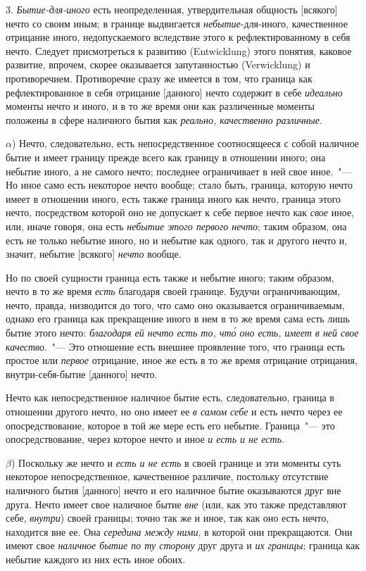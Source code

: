 3. \emph{Бытие-для-иного} есть неопределенная, утвердительная
общность [всякого] нечто со своим иным; в границе
выдвигается \emph{небытие}-для-иного, качественное отрицание
иного, недопускаемого вследствие этого к рефлектированному
в себя нечто. Следует присмотреться к развитию
(Entwicklung) этого понятия, каковое развитие, впрочем,
скорее оказывается запутанностью (Verwicklung) и противоречием.
Противоречие сразу же имеется в том, что граница
как рефлектированное в себя отрицание [данного] нечто
содержит в себе \emph{идеально} моменты нечто и иного, и в то же
время они как различенные моменты положены в сфере
наличного бытия как \emph{реально, качественно различные}.

$\alpha$) Нечто, следовательно, есть непосредственное соотносящееся
с собой наличное бытие и имеет границу прежде
всего как границу в отношении иного; она небытие
иного, а не самого нечто; последнее ограничивает в ней
свое иное.~"--- Но иное само есть некоторое нечто вообще;
стало быть, граница, которую нечто имеет в отношении
иного, есть также граница иного как нечто, граница этого
нечто, посредством которой оно не допускает к себе
первое нечто как \emph{свое} иное, или, иначе говоря, она есть
\emph{небытие этого первого нечто}; таким образом, она есть не
только небытие иного, но и небытие как одного, так и
другого нечто и, значит, небытие [всякого] \emph{нечто} вообще.

Но по своей сущности граница есть также и небытие
иного; таким образом, нечто в то же время \emph{есть} благодаря
своей границе. Будучи ограничивающим, нечто,
правда, низводится до того, что само оно оказывается
ограничиваемым, однако его граница как прекращение
иного в нем в то же время сама есть лишь бытие этого
нечто: \emph{благодаря ей нечто есть то, чт\'о оно есть, имеет в
ней свое качество}.~"--- Это отношение есть внешнее проявление
того, что граница есть простое или \emph{первое} отрицание,
иное же есть в то же время отрицание отрицания,
внутри-себя-бытие [данного] нечто.

Нечто как непосредственное наличное бытие есть, следовательно,
граница в отношении другого нечто, но оно
имеет ее \emph{в самом себе} и есть нечто через ее опосредствование,
которое в той же мере есть его небытие. Граница~"---
это опосредствование, через которое нечто и иное
\emph{и есть и не есть}.

$\beta$) Поскольку же нечто и \emph{есть и не есть} в своей границе
и эти моменты суть некоторое непосредственное, качественное
различие, постольку отсутствие наличного
бытия [данного] нечто и его наличное бытие оказываются
друг вне друга. Нечто имеет свое наличное бытие \emph{вне}
(или, как это также представляют себе, \emph{внутри}) своей
границы; точно так же и иное, так как оно есть нечто,
находится вне ее. Она \emph{середина между ними}, в которой
они прекращаются. Они имеют свое \emph{наличное бытие по
ту сторону} друг друга и \emph{их границы}; граница как небытие
каждого из них есть иное обоих.

